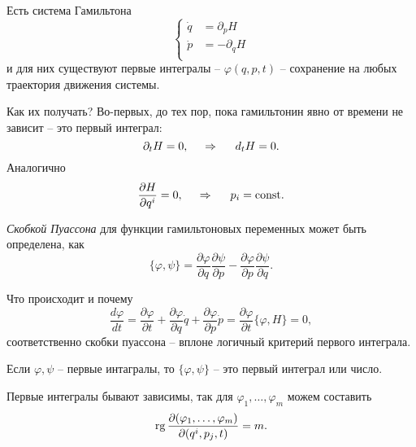 Есть система Гамильтона
\begin{equation*}
    \left\{\begin{aligned}
        \dot{q} &= \partial_p H \\
        \dot{p} &= - \partial_q H \\
    \end{aligned}\right.
\end{equation*}
и для них существуют первые интегралы -- $\varphi(q, p, t)$ -- сохранение на любых траектория движения системы.

Как их получать? Во-первых, до тех пор, пока гамильтонин явно от времени не зависит -- это первый интеграл:
\begin{equation*}
    \partial_t H = 0, \hspace{0.5cm} \Rightarrow \hspace{0.5cm} d_t H = 0.
\end{equation*}
Аналогично
\begin{equation*}
    \frac{\partial H}{\partial q^i} = 0,
    \hspace{0.5cm} \Rightarrow \hspace{0.5cm}
    p_i = \text{const}.
\end{equation*}

\begin{to_def}
    \textit{Скобкой Пуассона} для функции гамильтоновых переменных может быть определена, как
    \begin{equation*}
        \{\varphi, \psi\} = \frac{\partial \varphi}{\partial q} \frac{\partial \psi}{\partial p} -
        \frac{\partial \varphi}{\partial p} \frac{\partial \psi}{\partial q}.
    \end{equation*}
\end{to_def}

Что происходит и почему
\begin{equation*}
    \frac{d \varphi}{d t} = \frac{\partial \varphi}{\partial t} + \frac{\partial \varphi}{\partial q} \dot{q} + \frac{\partial \varphi}{\partial p} \dot{p} = \frac{\partial \varphi}{\partial t} \{\varphi, H\} = 0,
\end{equation*}
соответственно скобки пуассона -- вплоне логичный критерий первого интеграла.

\begin{to_thr}[]
    Если $\varphi, \psi$ -- первые интагралы, то $\{\varphi, \psi\}$ -- это первый интеграл или число.
\end{to_thr}

Первые интегралы бывают зависимы, так для $\varphi_1, \ldots, \varphi_m$ можем составить
\begin{equation*}
    \mathop{\mathrm{rg}}\nolimits \frac{\partial (\varphi_1, \ldots, \varphi_m)}{ \partial(q^i, p_j, t)} = m.
\end{equation*}

